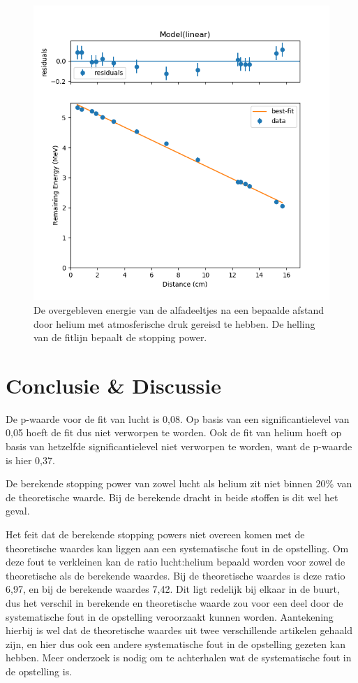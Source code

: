 \documentclass[11pt,a4paper]{article}
\begin{document}
\begin{figure}  %
\centering
\includegraphics[scale=0.7]{grafiek_helium}
\caption{De overgebleven energie van de alfadeeltjes na een bepaalde afstand door helium met atmosferische druk gereisd te hebben. De helling van de fitlijn bepaalt de stopping power.}
\label{fig:figuur2}
\end{figure}

\newpage

\section*{Conclusie \& Discussie}
De p-waarde voor de fit van lucht is 0,08. Op basis van een significantielevel van 0,05 hoeft de fit dus niet verworpen te worden. Ook de fit van helium hoeft op basis van hetzelfde significantielevel niet verworpen te worden, want de p-waarde is hier 0,37.

De berekende stopping power van zowel lucht als helium zit niet binnen 20\% van de theoretische waarde. Bij de berekende dracht in beide stoffen is dit wel het geval.

Het feit dat de berekende stopping powers niet overeen komen met de theoretische waardes kan liggen aan een systematische fout in de opstelling. Om deze fout te verkleinen kan de ratio lucht:helium bepaald worden voor zowel de theoretische als de berekende waardes. Bij de theoretische waardes is deze ratio 6,97, en bij de berekende waardes 7,42. Dit ligt redelijk bij elkaar in de buurt, dus het verschil in berekende en theoretische waarde zou voor een deel door de systematische fout in de opstelling veroorzaakt kunnen worden. Aantekening hierbij is wel dat de theoretische waardes uit twee verschillende artikelen gehaald zijn, en hier dus ook een andere systematische fout in de opstelling gezeten kan hebben. Meer onderzoek is nodig om te achterhalen wat de systematische fout in de opstelling is.
\end{document}
